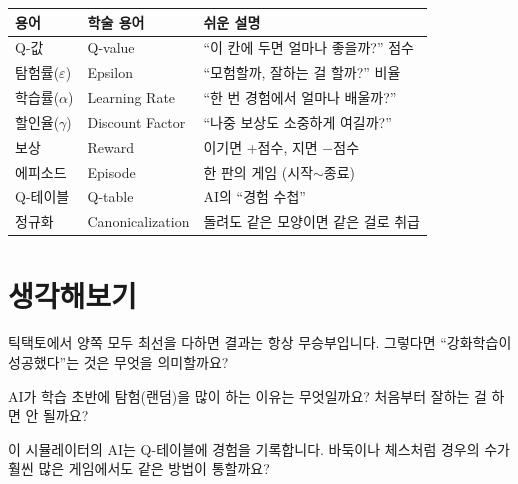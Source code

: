 \documentclass[11pt,a4paper]{article}
\begin{document}
\begin{center}
\renewcommand{\arraystretch}{1.4}
\small
\begin{tabular}{|l|l|p{6cm}|}
\hline
\rowcolor{tableheader}
\textbf{용어} & \textbf{학술 용어} & \textbf{쉬운 설명} \\
\hline
Q-값 & Q-value & ``이 칸에 두면 얼마나 좋을까?'' 점수 \\
\hline
탐험률($\varepsilon$) & Epsilon & ``모험할까, 잘하는 걸 할까?'' 비율 \\
\hline
학습률($\alpha$) & Learning Rate & ``한 번 경험에서 얼마나 배울까?'' \\
\hline
할인율($\gamma$) & Discount Factor & ``나중 보상도 소중하게 여길까?'' \\
\hline
보상 & Reward & 이기면 +점수, 지면 $-$점수 \\
\hline
에피소드 & Episode & 한 판의 게임 (시작$\sim$종료) \\
\hline
Q-테이블 & Q-table & AI의 ``경험 수첩'' \\
\hline
정규화 & Canonicalization & 돌려도 같은 모양이면 같은 걸로 취급 \\
\hline
\end{tabular}
\end{center}

\section{ 생각해보기}

\begin{infobox}
틱택토에서 양쪽 모두 최선을 다하면 결과는 항상 무승부입니다. 그렇다면 ``강화학습이 성공했다''는 것은 무엇을 의미할까요?
\end{infobox}

\begin{infobox}
AI가 학습 초반에 탐험(랜덤)을 많이 하는 이유는 무엇일까요? 처음부터 잘하는 걸 하면 안 될까요?
\end{infobox}

\begin{infobox}
이 시뮬레이터의 AI는 Q-테이블에 경험을 기록합니다. 바둑이나 체스처럼 경우의 수가 훨씬 많은 게임에서도 같은 방법이 통할까요?
\end{infobox}

\newpage
\end{document}
